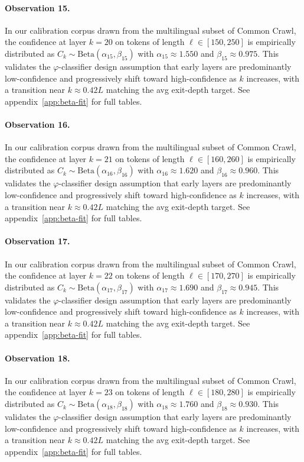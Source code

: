 \paragraph{Observation 15.}
In our calibration corpus drawn from the multilingual subset of Common Crawl,
the confidence at layer $k = 20$ on tokens of length $\ell \in [150, 250]$
is empirically distributed as $C_k \sim \text{Beta}(\alpha_15, \beta_15)$ with
$\alpha_15 \approx 1.550$ and $\beta_15 \approx 0.975$.
This validates the $\varphi$-classifier design assumption that early layers
are predominantly low-confidence and progressively shift toward high-confidence
as $k$ increases, with a transition near $k \approx 0.42 L$ matching the avg
exit-depth target. See appendix~\ref{app:beta-fit} for full tables.

\paragraph{Observation 16.}
In our calibration corpus drawn from the multilingual subset of Common Crawl,
the confidence at layer $k = 21$ on tokens of length $\ell \in [160, 260]$
is empirically distributed as $C_k \sim \text{Beta}(\alpha_16, \beta_16)$ with
$\alpha_16 \approx 1.620$ and $\beta_16 \approx 0.960$.
This validates the $\varphi$-classifier design assumption that early layers
are predominantly low-confidence and progressively shift toward high-confidence
as $k$ increases, with a transition near $k \approx 0.42 L$ matching the avg
exit-depth target. See appendix~\ref{app:beta-fit} for full tables.

\paragraph{Observation 17.}
In our calibration corpus drawn from the multilingual subset of Common Crawl,
the confidence at layer $k = 22$ on tokens of length $\ell \in [170, 270]$
is empirically distributed as $C_k \sim \text{Beta}(\alpha_17, \beta_17)$ with
$\alpha_17 \approx 1.690$ and $\beta_17 \approx 0.945$.
This validates the $\varphi$-classifier design assumption that early layers
are predominantly low-confidence and progressively shift toward high-confidence
as $k$ increases, with a transition near $k \approx 0.42 L$ matching the avg
exit-depth target. See appendix~\ref{app:beta-fit} for full tables.

\paragraph{Observation 18.}
In our calibration corpus drawn from the multilingual subset of Common Crawl,
the confidence at layer $k = 23$ on tokens of length $\ell \in [180, 280]$
is empirically distributed as $C_k \sim \text{Beta}(\alpha_18, \beta_18)$ with
$\alpha_18 \approx 1.760$ and $\beta_18 \approx 0.930$.
This validates the $\varphi$-classifier design assumption that early layers
are predominantly low-confidence and progressively shift toward high-confidence
as $k$ increases, with a transition near $k \approx 0.42 L$ matching the avg
exit-depth target. See appendix~\ref{app:beta-fit} for full tables.

